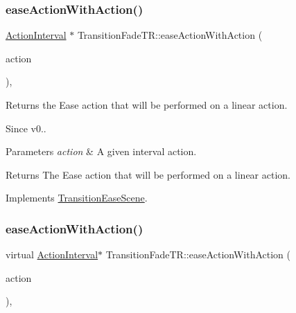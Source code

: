 \subsubsection{\texorpdfstring{ease\+Action\+With\+Action()}{easeActionWithAction()}\hspace{0.1cm}{\footnotesize\ttfamily [1/2]}}
{\footnotesize\ttfamily \hyperlink{classActionInterval}{Action\+Interval} $\ast$ Transition\+Fade\+T\+R\+::ease\+Action\+With\+Action (\begin{DoxyParamCaption}\item[{\hyperlink{classActionInterval}{Action\+Interval} $\ast$}]{action }\end{DoxyParamCaption})\hspace{0.3cm}{\ttfamily [override]}, {\ttfamily [virtual]}}

Returns the Ease action that will be performed on a linear action. \begin{DoxySince}{Since}
v0..
\end{DoxySince}

\begin{DoxyParams}{Parameters}
{\em action} & A given interval action. \\
\hline
\end{DoxyParams}
\begin{DoxyReturn}{Returns}
The Ease action that will be performed on a linear action. 
\end{DoxyReturn}


Implements \hyperlink{classTransitionEaseScene_a6f27540600b0d703ed30adc8976e65df}{Transition\+Ease\+Scene}.

\mbox{\label{classTransitionFadeTR_a044517e402fd76f102f143c8e00dc852}} 
\subsubsection{\texorpdfstring{ease\+Action\+With\+Action()}{easeActionWithAction()}\hspace{0.1cm}{\footnotesize\ttfamily [2/2]}}
{\footnotesize\ttfamily virtual \hyperlink{classActionInterval}{Action\+Interval}$\ast$ Transition\+Fade\+T\+R\+::ease\+Action\+With\+Action (\begin{DoxyParamCaption}\item[{\hyperlink{classActionInterval}{Action\+Interval} $\ast$}]{action }\end{DoxyParamCaption})\hspace{0.3cm}{\ttfamily [override]}, {\ttfamily [virtual]}}

